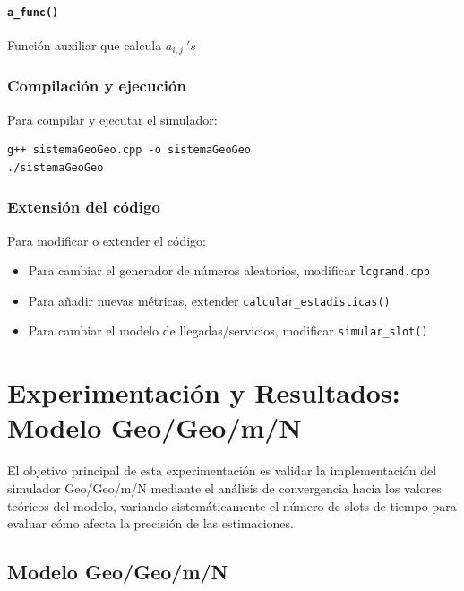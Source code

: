 \documentclass{article}
\begin{document}
\paragraph{\texttt{a\_func()}}
Función auxiliar que calcula $a_{i,j} \ 's$

\subsubsection{Compilación y ejecución}

Para compilar y ejecutar el simulador:

\begin{verbatim}
g++ sistemaGeoGeo.cpp -o sistemaGeoGeo 
./sistemaGeoGeo
\end{verbatim}

\subsubsection{Extensión del código}

Para modificar o extender el código:
\begin{itemize}
    \item Para cambiar el generador de números aleatorios, modificar \texttt{lcgrand.cpp}
    \item Para añadir nuevas métricas, extender \texttt{calcular\_estadisticas()}
    \item Para cambiar el modelo de llegadas/servicios, modificar \texttt{simular\_slot()}
\end{itemize}






\section{Experimentación y Resultados: Modelo Geo/Geo/m/N}\label{sec:exp}
El objetivo principal de esta experimentación es validar la implementación del simulador Geo/Geo/m/N mediante el análisis de convergencia hacia los valores teóricos del modelo, variando sistemáticamente el número de slots de tiempo para evaluar cómo afecta la precisión de las estimaciones.
\subsection{Modelo Geo/Geo/m/N}
\end{document}
